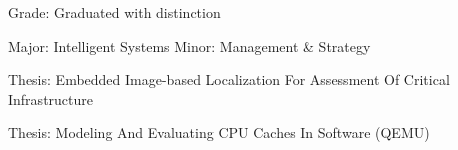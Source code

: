 \documentclass[a4paper]{resume-cv}
\begin{document}
\lastupdated

\maketitlearea{}{}

\begin{minipage}[t]{\textwidth}
    \negsubsectionsep
    
    \begin{tightemize} %
        \item \textsf{Grade:} Graduated with distinction
        \item \textsf{Major:} Intelligent Systems \vlinesep \textsf{Minor:} Management \& Strategy
        \item \textsf{Thesis:} Embedded Image-based Localization For Assessment Of Critical Infrastructure
    \end{tightemize}
    
    \begin{tightemize} %
        \item \textsf{Thesis:} Modeling And Evaluating CPU Caches In Software (QEMU)
    \end{tightemize}


    

\end{minipage}
\end{document}
